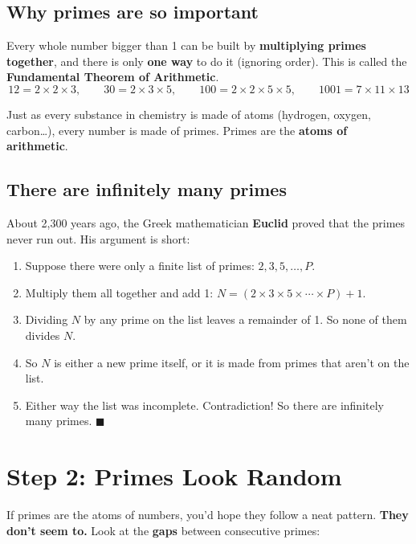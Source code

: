 \documentclass[11pt,a4paper]{article}
\begin{document}
\subsection*{Why primes are so important}

Every whole number bigger than 1 can be built by \textbf{multiplying primes together}, and there is only \textbf{one way} to do it (ignoring order). This is called the \textbf{Fundamental Theorem of Arithmetic}.
\[
12 = 2\times2\times3, \qquad 30 = 2\times3\times5, \qquad 100 = 2\times2\times5\times5, \qquad 1001 = 7\times11\times13
\]

\begin{analogy}
Just as every substance in chemistry is made of atoms (hydrogen, oxygen, carbon\ldots), every number is made of primes. Primes are the \textbf{atoms of arithmetic}.
\end{analogy}

\subsection*{There are infinitely many primes}

About 2,300 years ago, the Greek mathematician \textbf{Euclid} proved that the primes never run out. His argument is short:
\begin{enumerate}[itemsep=1pt]
  \item Suppose there were only a finite list of primes: $2, 3, 5, \ldots, P$.
  \item Multiply them all together and add 1: $N = (2\times3\times5\times\cdots\times P) + 1$.
  \item Dividing $N$ by any prime on the list leaves a remainder of 1. So none of them divides $N$.
  \item So $N$ is either a new prime itself, or it is made from primes that aren't on the list.
  \item Either way the list was incomplete. Contradiction! So there are infinitely many primes. \hfill$\blacksquare$
\end{enumerate}

\section{Step 2: Primes Look Random}

If primes are the atoms of numbers, you'd hope they follow a neat pattern. \textbf{They don't seem to.} Look at the \textbf{gaps} between consecutive primes:
\end{document}
